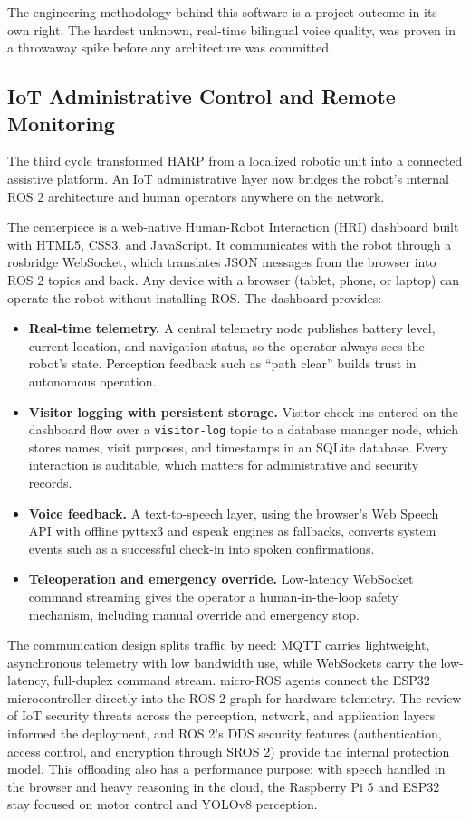 \documentclass[11pt,a4paper]{article}
\begin{document}
The engineering methodology behind this software is a project outcome in its own right. The hardest unknown, real-time bilingual voice quality, was proven in a throwaway spike before any architecture was committed. 

\subsection{IoT Administrative Control and Remote Monitoring}

The third cycle transformed HARP from a localized robotic unit into a connected assistive platform. An IoT administrative layer now bridges the robot's internal ROS 2 architecture and human operators anywhere on the network.

The centerpiece is a web-native Human-Robot Interaction (HRI) dashboard built with HTML5, CSS3, and JavaScript. It communicates with the robot through a rosbridge WebSocket, which translates JSON messages from the browser into ROS 2 topics and back. Any device with a browser (tablet, phone, or laptop) can operate the robot without installing ROS. The dashboard provides:

\begin{itemize}
\item \textbf{Real-time telemetry.} A central telemetry node publishes battery level, current location, and navigation status, so the operator always sees the robot's state. Perception feedback such as ``path clear'' builds trust in autonomous operation.
\item \textbf{Visitor logging with persistent storage.} Visitor check-ins entered on the dashboard flow over a \texttt{visitor-log} topic to a database manager node, which stores names, visit purposes, and timestamps in an SQLite database. Every interaction is auditable, which matters for administrative and security records.
\item \textbf{Voice feedback.} A text-to-speech layer, using the browser's Web Speech API with offline pyttsx3 and espeak engines as fallbacks, converts system events such as a successful check-in into spoken confirmations.
\item \textbf{Teleoperation and emergency override.} Low-latency WebSocket command streaming gives the operator a human-in-the-loop safety mechanism, including manual override and emergency stop.
\end{itemize}

The communication design splits traffic by need: MQTT carries lightweight, asynchronous telemetry with low bandwidth use, while WebSockets carry the low-latency, full-duplex command stream. micro-ROS agents connect the ESP32 microcontroller directly into the ROS 2 graph for hardware telemetry. The review of IoT security threats across the perception, network, and application layers informed the deployment, and ROS 2's DDS security features (authentication, access control, and encryption through SROS 2) provide the internal protection model. This offloading also has a performance purpose: with speech handled in the browser and heavy reasoning in the cloud, the Raspberry Pi 5 and ESP32 stay focused on motor control and YOLOv8 perception.
\end{document}
